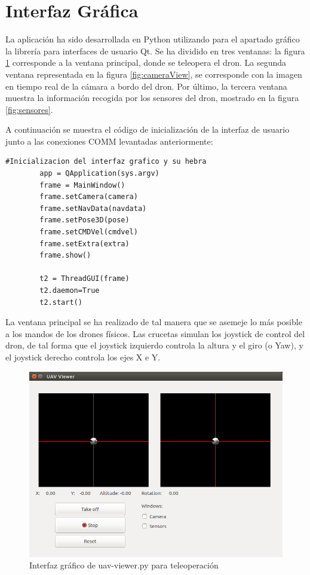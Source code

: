 \section{Interfaz Gráfica}

La aplicación ha sido desarrollada en Python utilizando para el apartado gráfico la librería
para interfaces de usuario Qt. Se ha dividido en tres ventanas: la figura \ref{fig:interfazUavViewer} corresponde a la ventana principal, donde se teleopera el dron. La segunda ventana representada en la figura \ref{fig:cameraView}, se corresponde con la imagen en tiempo real de la cámara a bordo del dron. Por último, la tercera ventana muestra la información recogida por los sensores del dron, mostrado en la figura \ref{fig:sensores}. 


A continuación se muestra el código de inicialización de la interfaz de usuario junto a las conexiones COMM levantadas anteriormente:

\begin{lstlisting}[frame=single]
		#Inicializacion del interfaz grafico y su hebra
        app = QApplication(sys.argv)
        frame = MainWindow()
        frame.setCamera(camera)
        frame.setNavData(navdata)
        frame.setPose3D(pose)
        frame.setCMDVel(cmdvel)
        frame.setExtra(extra)
        frame.show()

        t2 = ThreadGUI(frame)
        t2.daemon=True
        t2.start()
\end{lstlisting}

La ventana principal se ha realizado de tal manera que se asemeje lo más posible a los mandos de los drones físicos. Las crucetas simulan los joystick de control del dron, de tal forma que el joystick izquierdo controla la altura y el giro (o Yaw), y el joystick derecho controla los ejes X e Y. 

\begin{figure}[H]
  \centering
  \includegraphics[scale=0.35]{imagenes/Uav_viewer_py.png}
  \caption{Interfaz gráfico de uav-viewer.py para teleoperación}
  \label{fig:interfazUavViewer}
\end{figure}

